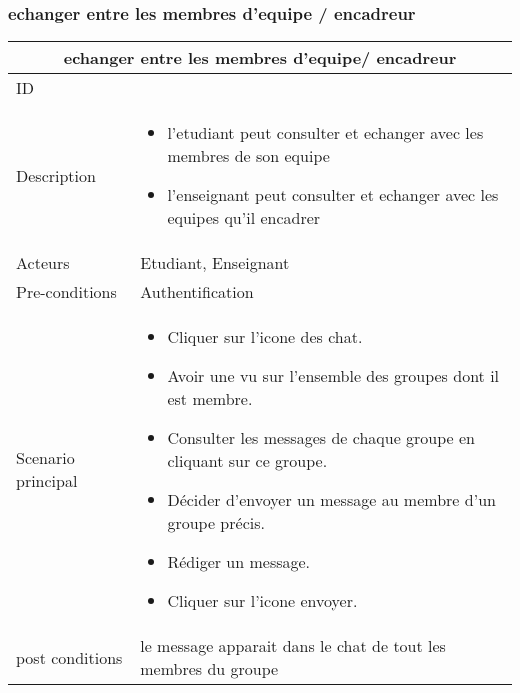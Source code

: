\documentclass[11pt,fleqn]{book} %
\begin{document}
\subsubsection{echanger entre les membres d'equipe / encadreur}
\begin{center}
\begin{tabularx}{1\textwidth} { | p{4cm} | >{\raggedright\arraybackslash}X |  }
  \hline
  \multicolumn{2}{|c|}{echanger entre les membres d'equipe/ encadreur} \\
 \hline
 ID & 1  \\
 \hline
 Description  &   \begin{itemize}
     \item l'etudiant peut consulter et echanger avec les membres de son equipe
     \item l'enseignant peut consulter et echanger avec les equipes qu'il encadrer
 \end{itemize}
 \\
  \hline
 Acteurs  & Etudiant, Enseignant   \\
  \hline
 Pre-conditions  & Authentification\\
 \hline
 Scenario principal  &  
 \begin{itemize}
     \item Cliquer sur l’icone des chat.
     \item Avoir une vu sur l’ensemble des groupes dont il est membre.
     \item Consulter les messages de chaque groupe en cliquant sur ce groupe.
     \item Décider d’envoyer un message au membre d’un groupe précis.
     \item Rédiger un message.
     \item Cliquer sur l’icone envoyer.
 \end{itemize}\\
  \hline
 post conditions  & le message apparait dans le chat de tout les membres du groupe  \\
  \hline
\end{tabularx}
\label{tbl:nicetablelesstable}
\end{center}

\end{document}
